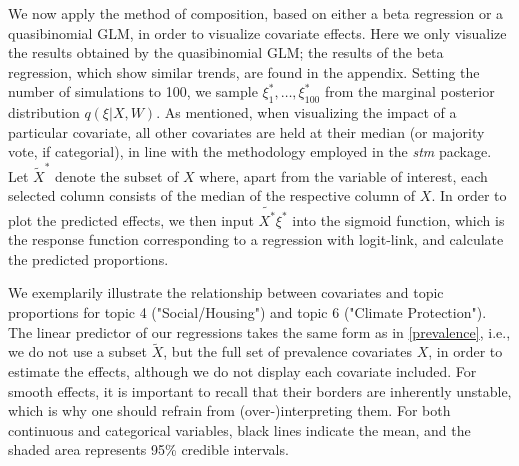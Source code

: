 We now apply the method of composition, based on either a beta regression or a quasibinomial GLM, in order to visualize covariate effects. Here we only visualize the results obtained by the quasibinomial GLM; the results of the beta regression, which show similar trends, are found in the appendix. Setting the number of simulations to 100, we sample $\xi^*_1, \dots, \xi^*_{100}$ from the  marginal posterior distribution $q(\xi | X, W)$. As mentioned, when visualizing the impact of a particular covariate, all other covariates are held at their median (or majority vote, if categorial), in line with the methodology employed in the \textit{stm} package.
Let $\tilde{X}^*$ denote the subset of $X$ where, apart from the variable of interest, each selected column consists of the median of the respective column of $X$. In order to plot the predicted effects, we then input $\tilde{X^*}\xi^*$ into the sigmoid function, which is the response function corresponding to a regression with logit-link, and calculate the predicted proportions. 

We exemplarily illustrate the relationship between covariates and topic proportions for topic 4 ("Social/Housing") and topic 6 ("Climate Protection"). The linear predictor of our regressions takes the same form as in  \eqref{prevalence}, i.e., we do not use a subset $\tilde{X}$, but the full set of prevalence covariates $X$, in order to estimate the effects, although we do not display each covariate included. For smooth effects, it is important to recall that their borders are inherently unstable, which is why one should refrain from (over-)interpreting them. For both continuous and categorical variables, black lines indicate the mean, and the shaded area represents 95\% credible intervals.

